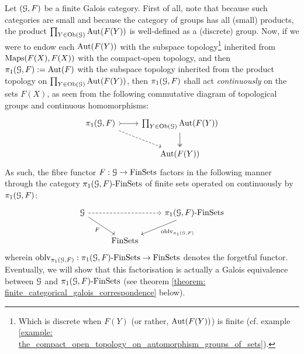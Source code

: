                 \begin{remark} \label{remark: action_of_fundamental_groups_on_fibres_finite_galois_categories}
                    Let $(\mathcal{G}, F)$ be a finite Galois category. First of all, note that because such categories are small and because the category of groups has all (small) products, the product $\prod_{Y \in \mathrm{Ob}(\mathcal{G})} \mathrm{Aut}(F(Y))$ is well-defined as a (discrete) group. Now, if we were to endow each $\mathrm{Aut}(F(Y))$ with the subspace topology\footnote{Which is discrete when $F(Y)$ (or rather, $\mathrm{Aut}(F(Y))$) is finite (cf. example \ref{example: the_compact_open_topology_on_automorphism_groups_of_sets}).} inherited from $\mathrm{Maps}(F(X), F(X))$ with the compact-open topology, and then $\pi_1(\mathcal{G}, F) := \mathrm{Aut}(F)$ with the subspace topology inherited from the product topology on $\prod_{Y \in \mathrm{Ob}(\mathcal{G})} \mathrm{Aut}(F(Y))$, then $\pi_1(\mathcal{G}, F)$ shall act \textit{continuously} on the sets $F(X)$, as seen from the following commutative diagram of topological groups and continuous homomorphisms:
                        $$
                            \begin{tikzcd}
                            	{\pi_1(\calG, F)} & {\prod_{Y \in \Ob(\calG)} \Aut(F(Y))} \\
                            	& {\Aut(F(Y))}
                            	\arrow[tail, from=1-1, to=1-2]
                            	\arrow[two heads, from=1-2, to=2-2]
                            	\arrow[dashed, from=1-1, to=2-2]
                            \end{tikzcd}
                        $$
                    As such, the fibre functor $F: \mathcal{G} \to \mathrm{Fin}\mathrm{Sets}$ factors in the following manner through the category $\pi_1(\mathcal{G}, F)\text{-}\mathrm{Fin}\mathrm{Sets}$ of finite sets operated on continuously by $\pi_1(\mathcal{G}, F)$:
                        $$
                            \begin{tikzcd}
                            	\calG && {\pi_1(\calG, F)\-\Fin\Sets} \\
                            	& \Fin\Sets
                            	\arrow[dashed, from=1-1, to=1-3]
                            	\arrow["F"', from=1-1, to=2-2]
                            	\arrow["{\oblv_{\pi_1(\calG, F)}}", from=1-3, to=2-2]
                            \end{tikzcd}
                        $$
                    wherein $\mathrm{oblv}_{\pi_1(\mathcal{G}, F)}: \pi_1(\mathcal{G}, F)\text{-}\mathrm{Fin}\mathrm{Sets} \to \mathrm{Fin}\mathrm{Sets}$ denotes the forgetful functor. Eventually, we will show that this factorisation is actually a Galois equivalence between $\mathcal{G}$ and $\pi_1(\mathcal{G}, F)\text{-}\mathrm{Fin}\mathrm{Sets}$ (see theorem \ref{theorem: finite_categorical_galois_correspondence} below).
                \end{remark}
